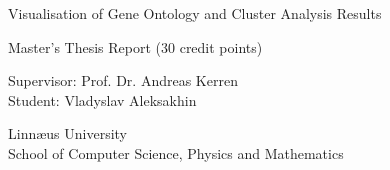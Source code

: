 \begin{titlepage}
\begin{center}

\Huge{Visualisation of Gene Ontology and Cluster Analysis Results}

\vfill

\begin{Large}
Master's Thesis Report (30 credit points)

\vfill

Supervisor: Prof. Dr. Andreas Kerren\\
Student: Vladyslav Aleksakhin

\vfill

Linn\ae us University\\
School of Computer Science, Physics and Mathematics

\end{Large}


\end{center}
\end{titlepage}
